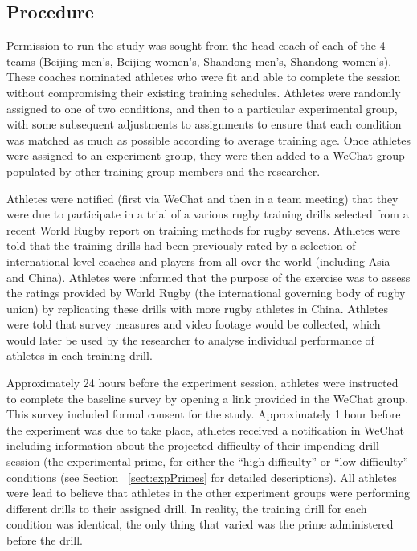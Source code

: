 \begin{CJK}{UTF8}{gbsn}
\subsection{Procedure}
Permission to run the study was sought from the head coach of each of the 4 teams (Beijing men's, Beijing women's, Shandong men's, Shandong women's).  These coaches nominated athletes who were fit and able to complete the session without compromising their existing training schedules.  Athletes were randomly assigned to one of two conditions, and then to a particular experimental group, with some subsequent adjustments to assignments to ensure that each condition was matched as much as possible according to average training age.  Once athletes were assigned to an experiment group, they were then added to a WeChat group populated by other training group members and the researcher.

Athletes were notified (first via WeChat and then in a team meeting) that they were due to participate in a trial of a various rugby training drills selected from a recent World Rugby report on training methods for rugby sevens.  Athletes were told that the training drills had been previously rated by a selection of international level coaches and players from all over the world (including Asia and China).  Athletes were informed that the purpose of the exercise was to assess the ratings provided by World Rugby (the international governing body of rugby union) by replicating these drills with more rugby athletes in China.  Athletes were told that survey measures and video footage would be collected, which would later be used by the researcher to analyse individual performance of athletes in each training drill.


Approximately 24 hours before the experiment session, athletes were instructed to complete the baseline survey by opening a link provided in the WeChat group.  This survey included formal consent for the study.  Approximately 1 hour before the experiment was due to take place, athletes received a notification in WeChat including information about the projected difficulty of their impending drill session (the experimental prime, for either the ``high difficulty'' or ``low difficulty'' conditions (see Section ~\ref{sect:expPrimes} for detailed descriptions).   All athletes were lead to believe that athletes in the other experiment groups were performing different drills to their assigned drill.  In reality, the training drill for each condition was identical, the only thing that varied was the prime administered before the drill.


\end{CJK}
